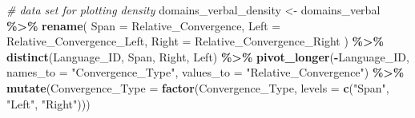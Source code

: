 \documentclass[
]{article}
\newenvironment{Shaded}{\begin{snugshade}}{\end{snugshade}}
\newcommand{\AttributeTok}[1]{\textcolor[rgb]{0.13,0.29,0.53}{#1}}
\newcommand{\CommentTok}[1]{\textcolor[rgb]{0.56,0.35,0.01}{\textit{#1}}}
\newcommand{\FunctionTok}[1]{\textcolor[rgb]{0.13,0.29,0.53}{\textbf{#1}}}
\newcommand{\NormalTok}[1]{#1}
\newcommand{\OtherTok}[1]{\textcolor[rgb]{0.56,0.35,0.01}{#1}}
\newcommand{\SpecialCharTok}[1]{\textcolor[rgb]{0.81,0.36,0.00}{\textbf{#1}}}
\newcommand{\StringTok}[1]{\textcolor[rgb]{0.31,0.60,0.02}{#1}}
\begin{document}
\begin{Shaded}
\begin{Highlighting}[]
\CommentTok{\# data set for plotting density}
\NormalTok{domains\_verbal\_density }\OtherTok{\textless{}{-}}\NormalTok{ domains\_verbal }\SpecialCharTok{\%\textgreater{}\%}
  \FunctionTok{rename}\NormalTok{(}
    \AttributeTok{Span =}\NormalTok{ Relative\_Convergence,}
    \AttributeTok{Left =}\NormalTok{ Relative\_Convergence\_Left,}
    \AttributeTok{Right =}\NormalTok{ Relative\_Convergence\_Right}
\NormalTok{  ) }\SpecialCharTok{\%\textgreater{}\%}
  \FunctionTok{distinct}\NormalTok{(Language\_ID, Span, Right, Left) }\SpecialCharTok{\%\textgreater{}\%}
  \FunctionTok{pivot\_longer}\NormalTok{(}\SpecialCharTok{{-}}\NormalTok{Language\_ID, }\AttributeTok{names\_to =} \StringTok{"Convergence\_Type"}\NormalTok{, }\AttributeTok{values\_to =} \StringTok{"Relative\_Convergence"}\NormalTok{) }\SpecialCharTok{\%\textgreater{}\%}
  \FunctionTok{mutate}\NormalTok{(}\AttributeTok{Convergence\_Type =} \FunctionTok{factor}\NormalTok{(Convergence\_Type, }\AttributeTok{levels =} \FunctionTok{c}\NormalTok{(}\StringTok{"Span"}\NormalTok{, }\StringTok{"Left"}\NormalTok{, }\StringTok{"Right"}\NormalTok{)))}


\end{Highlighting}
\end{Shaded}
\end{document}
